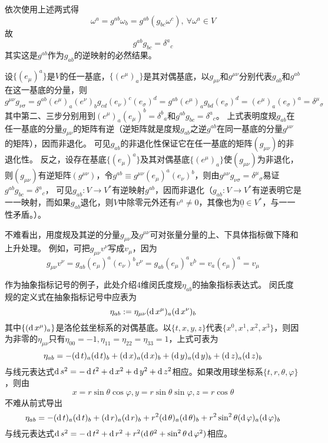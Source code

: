 依次使用上述两式得
$$\omega^a = g^{ab}\omega_b = g^{ab}(g_{bc}\omega^c), ~ \forall \omega^a \in V$$
故
$$g^{ab}g_{bc} = \delta^a{}_c$$
其实这是$g^{ab}$作为$g_{ab}$的逆映射的必然结果。

设$\{(e_\mu)^a\}$是$V$的任一基底，$\{(e^\mu)_a\}$是其对偶基底，以$g_{\mu\nu}$和$g^{\mu\nu}$分别代表$g_{ab}$和$g^{ab}$在这一基底的分量，则
$$g^{\mu\nu}g_{\nu\sigma} = g^{ab}(e^\mu)_a(e^\nu)_bg_{cd}(e_\nu)^c(e_\sigma)^d = g^{ab}(e^\mu)_ag_{bd}(e_\sigma)^d = (e^\mu)_a(e_\sigma)^a = \delta^\mu{}_\sigma$$
其中第二、三步分别用到$(e^\mu)_a(e_\mu)^b = \delta^b{}_a$和$g^{ab}g_{bc} = \delta^a{}_c$。
上式表明度规$g_{ab}$在任一基底的分量$g_{\mu\nu}$的矩阵有逆（逆矩阵就是度规$g_{ab}$之逆$g^{ab}$在同一基底的分量$g^{\mu\nu}$的矩阵），因而非退化。
可见$g_{ab}$的非退化性保证它在任一基底的矩阵$(g_{\mu\nu})$的非退化性。
反之，设存在基底$\{(e_\mu)^a\}$及其对偶基底$\{(e^\mu)_a\}$使$(g_{\mu\nu})$为非退化，则$(g_{\mu\nu})$有逆矩阵$(g^{\mu\nu})$，令$g^{ab} \equiv g^{\mu\nu}(e_\mu)^a(e_\nu)^b$，则由$g^{\mu\nu}g_{\nu\sigma} = \delta^\mu{}_\sigma$易证$g^{ab}g_{bc} = \delta^a{}_c$，
可见$g_{ab} \colon V \to V^*$有逆映射$g^{ab}$，因而非退化（$g_{ab} \colon V \to V^*$有逆表明它是一一映射，而如果$g_{ab}$退化，则$V$中除零元外还有$v^a \neq 0$，其像也为$\underline{0} \in V^*$，与一一性矛盾。）。

不难看出，用度规及其逆的分量$g_{\mu\nu}$及$g^{\mu\nu}$可对张量分量的上、下具体指标做下降和上升处理。
例如，可把$g_{\mu\nu}v^\nu$写成$v_\mu$，因为
$$g_{\mu\nu}v^\nu = g_{ab}(e_\mu)^a(e_\nu)^bv^\nu = g_{ab}(e_\mu)^av^b = v_a(e_\mu)^a = v_\mu$$

作为抽象指标记号的例子，此处介绍$4$维闵氏度规$\eta_{ab}$的抽象指标表达式。
闵氏度规的定义式在抽象指标记号中应表为
$$\eta_{ab} := \eta_{\mu\nu}(\operatorname{d} x^\mu)_a(\operatorname{d} x^\nu)_b$$
其中$\{(\operatorname{d} x^\mu)_a\}$是洛伦兹坐标系的对偶基底。以$\{t, x, y, z\}$代表$\{x^0, x^1, x^2, x^3\}$，则因为非零的$\eta_{\mu\nu}$只有$\eta_{00} = -1, \eta_{11} = \eta_{22} = \eta_{33} = 1$，上式可表为
$$\eta_{ab} = -(\operatorname{d} t)_a(\operatorname{d} t)_b + (\operatorname{d} x)_a(\operatorname{d} x)_b + (\operatorname{d} y)_a(\operatorname{d} y)_b + (\operatorname{d} z)_a(\operatorname{d} z)_b$$
与线元表达式$\operatorname{d} s^2 = -\operatorname{d} t^2 + \operatorname{d} x^2 + \operatorname{d} y^2 + \operatorname{d} z^2$相应。如果改用球坐标系$\{t, r, \theta, \varphi\}$，则由
$$x = r\sin\theta\cos\varphi, y = r\sin\theta\sin\varphi, z = r\cos\theta$$
不难从前式导出
$$\eta_{ab} = -(\operatorname{d} t)_a(\operatorname{d} t)_b + (\operatorname{d} r)_a(\operatorname{d} r)_b + r^2(\operatorname{d} \theta)_a(\operatorname{d} \theta)_b + r^2\sin^2\theta(\operatorname{d} \varphi)_a(\operatorname{d} \varphi)_b$$
与线元表达式$\operatorname{d} s^2 = -\operatorname{d} t^2 + \operatorname{d} r^2 + r^2(\operatorname{d} \theta^2 + \sin^2\theta\operatorname{d}\varphi^2)$相应。

